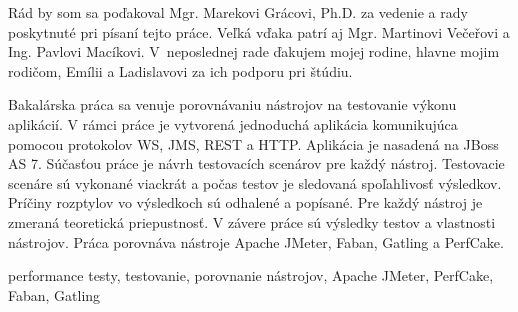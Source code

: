\documentclass[12pt,oneside,final]{fithesis-utf8}
\begin{document}
\FrontMatter
\ThesisTitlePage

\begin{ThesisDeclaration}
\DeclarationText
\AdvisorName
\end{ThesisDeclaration}

\begin{ThesisThanks}

Rád by som sa poďakoval Mgr. Marekovi Grácovi, Ph.D.	za vedenie a rady poskytnuté pri písaní tejto práce. Veľká vďaka patrí aj Mgr. Martinovi Večeřovi a Ing. Pavlovi Macíkovi. V~neposlednej rade ďakujem mojej rodine, hlavne mojim rodičom, Emílii a Ladislavovi za ich podporu pri štúdiu.

\end{ThesisThanks}

\begin{ThesisAbstract}
Bakalárska práca sa venuje porovnávaniu nástrojov na testovanie výkonu aplikácií. V rámci práce je vytvorená jednoduchá aplikácia komunikujúca pomocou protokolov WS, JMS, REST a HTTP. Aplikácia je nasadená na JBoss AS 7. Súčasťou práce je návrh testovacích scenárov pre každý nástroj. Testovacie scenáre sú vykonané viackrát a počas testov je sledovaná spoľahlivosť výsledkov. Príčiny rozptylov vo výsledkoch sú odhalené a popísané. Pre každý nástroj je zmeraná teoretická priepustnosť. V závere práce sú výsledky testov a vlastnosti nástrojov. Práca porovnáva nástroje Apache JMeter, Faban, Gatling a PerfCake.
\end{ThesisAbstract}

\begin{ThesisKeyWords}
performance testy, testovanie, porovnanie nástrojov, Apache JMeter, PerfCake, Faban, Gatling
\end{ThesisKeyWords}

\tableofcontents
\MainMatter
\end{document}
